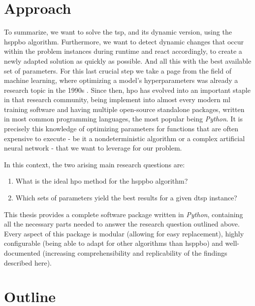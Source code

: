 \section{Approach}
\label{chap:approach}

To summarize, we want to solve the \gls{tsp}, and its dynamic version, using the \gls{hsppbo} algorithm. Furthermore, we want to detect dynamic changes that occur within the problem instances during runtime and react accordingly, to create a newly adapted solution as quickly as possible. And all this with the best available set of parameters. For this last crucial step we take a page from the field of machine learning, where optimizing a model's hyperparameters was already a research topic in the 1990s \cite{feurer2019hyperparameter}. Since then, \gls{hpo} has evolved into an important staple in that research community, being implement into almost every modern \gls{ml} training software and having multiple open-source standalone packages, written in most common programming languages, the most popular being \textit{Python}.
It is precisely this knowledge of optimizing parameters for functions that are often expensive to execute - be it a nondeterministic algorithm or a complex artificial neural network - that we want to leverage for our problem.

In this context, the two arising main research questions are:
\begin{enumerate}
	\item What is the ideal \gls{hpo} method for the \gls{hsppbo} algorithm?
	\item Which sets of parameters yield the best results for a given \gls{dtsp} instance?
\end{enumerate}

This thesis provides a complete software package written in \textit{Python}, containing all the necessary parts needed to answer the research question outlined above. Every aspect of this package is modular (allowing for easy replacement), highly configurable (being able to adapt for other algorithms than \gls{hsppbo}) and well-documented (increasing comprehensibility and replicability of the findings described here).


\section{Outline}

